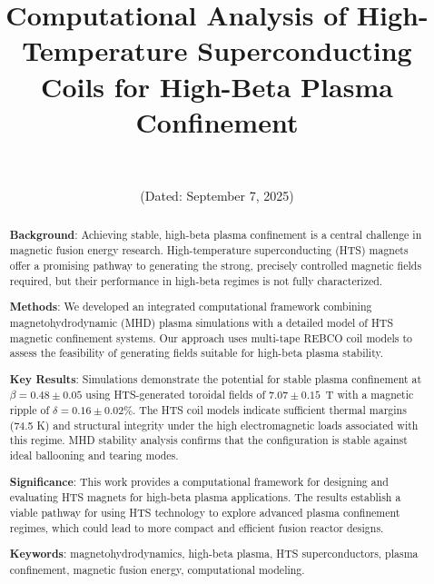 \documentclass[12pt,a4paper]{article}
\begin{document}
\title{Computational Analysis of High-Temperature Superconducting Coils for High-Beta Plasma Confinement}

\author{\authorname\\\texttt{\authoremail}}
\date{(Dated: September 7, 2025)}

\maketitle

\begin{abstract}
\textbf{Background}: Achieving stable, high-beta plasma confinement is a central challenge in magnetic fusion energy research. High-temperature superconducting (HTS) magnets offer a promising pathway to generating the strong, precisely controlled magnetic fields required, but their performance in high-beta regimes is not fully characterized.

\textbf{Methods}: We developed an integrated computational framework combining magnetohydrodynamic (MHD) plasma simulations with a detailed model of HTS magnetic confinement systems. Our approach uses multi-tape REBCO coil models to assess the feasibility of generating fields suitable for high-beta plasma stability.

\textbf{Key Results}: Simulations demonstrate the potential for stable plasma confinement at $\beta = 0.48 \pm 0.05$ using HTS-generated toroidal fields of $7.07 \pm 0.15$~T with a magnetic ripple of $\delta = 0.16 \pm 0.02\%$. The HTS coil models indicate sufficient thermal margins (74.5 K) and structural integrity under the high electromagnetic loads associated with this regime. MHD stability analysis confirms that the configuration is stable against ideal ballooning and tearing modes.

\textbf{Significance}: This work provides a computational framework for designing and evaluating HTS magnets for high-beta plasma applications. The results establish a viable pathway for using HTS technology to explore advanced plasma confinement regimes, which could lead to more compact and efficient fusion reactor designs.

\textbf{Keywords}: magnetohydrodynamics, high-beta plasma, HTS superconductors, plasma confinement, magnetic fusion energy, computational modeling.
\end{abstract}
\end{document}
